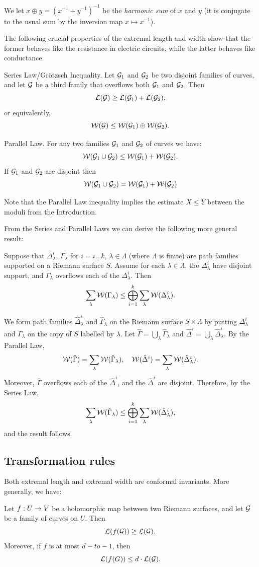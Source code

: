 We let $ x\oplus y = (x^{-1} + y^{-1})^{-1}$ be the {\it harmonic sum} of $x$ and $y$
(it is conjugate to the usual sum by the inversion map $x\mapsto x^{-1}$). 

The following crucial properties of the extremal length and width show
that the former behaves like the resistance in electric circuits,
while the latter behaves like conductance.

\proclaim  Series Law/Gr\"otzsch Inequality. 
 Let ${\cal G}_1$ and ${\cal G}_2$ be two disjoint families of  curves,
 and let ${\cal G}$ be   a third family
that overflows both ${\cal G}_1$ and ${\cal G}_2$. Then 
$$  {\cal L}({\cal G}) \geq {\cal L}({\cal G}_1) + {\cal L}({\cal G}_2), $$
or equivalently,
$$  {\cal W}({\cal G})\leq {\cal W}({\cal G}_1)\oplus {\cal W}({\cal G}_2). $$ 

\proclaim Parallel Law.
  For any two families ${\cal G}_1$ and ${\cal G}_2$ of curves we have:
$$
    {\cal W}({\cal G}_1\cup {\cal G}_2)\leq {\cal W}({\cal G}_1) + {\cal W}({\cal G}_2).
$$
If ${\cal G}_1$ and ${\cal G}_2$ are disjoint then 
$$
  {\cal W}({\cal G}_1\cup {\cal G}_2) = {\cal W}({\cal G}_1) + {\cal W}({\cal G}_2)
$$

Note that the Parallel Law inequality implies the estimate $X\leq Y$ between the moduli
from the Introduction. 

\ssk

From the Series and Parallel Laws we can derive the following more general result:
%
{\def\l{\lambda}\def\L{\Lambda}\def\D{\Delta}\def\G{\Gamma}
\begin{prop} \label{massive parallel}
Suppose that $\D_\l^i$, $\G_\l$ for $i = i \ldots k$, $\l \in \L$
(where $\L$ is finite)
are path families supported on a Riemann surface $S$. 
Assume for each $\l \in \L$,
the $\D^i_\l$ have disjoint support,
and $\G_\l$ overflows each of the $\D^i_\l$.
Then
$$
\sum_\l \WW(\G_\l) \le \bigoplus_{i=1}^k \sum_\l \WW(\D_\l^i).
$$ 
\end{prop}
%
\begin{pf}
We form path families $\hat \D^i_\l$ and $\hat \G_\l$ 
 on the Riemann surface $S \times \L$ 
by putting $\D^i_\l$ and $\G_\l$
on the copy of $S$ labelled by $\l$.
Let $\hat \G = \bigcup_\l \hat \G_\l$
and  $\hat \D^i = \bigcup_\l \hat \D_\l^i$.
By the Parallel Law,
$$
   \WW(\hat \G) = \sum_\l \WW(\hat \G_\l), \quad
   \WW(\hat \D^i) = \sum_\l \WW(\hat \D^i_\l).
$$
Moreover,   $\hat \G$ overflows each of the $\hat \D^i$,
and the $\hat \D^i$ are disjoint.
Therefore,  
by the Series Law,
$$
\sum_\l \WW(\hat \G_\l) \le \bigoplus_{i=1}^k \sum_\l \WW(\hat \D_\l^i),
$$
and the result follows.
\end{pf}
}

\subsection{Transformation rules}
 Both extremal length and extremal width  are conformal invariants. 
 More generally, we have:
\begin{lem}\label{increase}
   Let $f: U\rightarrow V$ be a holomorphic map between two Riemann surfaces,
and let ${\cal G}$ be a family of curves on $U$. Then 
$$
      {\cal L}(f({\cal G}))\geq {\cal L}({\cal G}).
$$
Moreover, if $f$ is at most $d-to-1$, then 
$$
   {\cal L} (f(G)) \leq d\cdot  {\cal L}({\cal G}).
$$ 
\end{lem}

